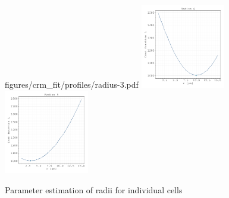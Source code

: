 \documentclass{article}
\begin{document}
\begin{figure}
        {figures/crm_fit/profiles/radius-3.pdf}%
    \includegraphics[width=0.33\textwidth]
        {figures/crm_fit/profiles/radius-4.pdf}%
    \includegraphics[width=0.33\textwidth]
        {figures/crm_fit/profiles/radius-5.pdf}%
    \caption{Parameter estimation of radii for individual cells}%
    \label{fig:parameter-estimates-supplement-radii}
\end{figure}

\end{document}
